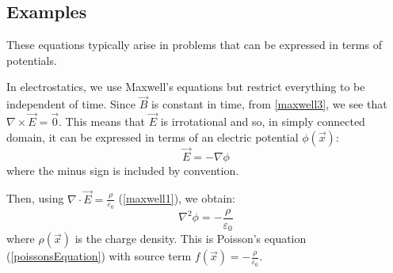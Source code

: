 \documentclass[../main.tex]{subfiles}
\begin{document}
\subsection{Examples}
These equations typically arise in problems that can be expressed in terms of potentials.
\begin{example}[Electrostatics]
  In electrostatics, we use Maxwell's equations but restrict everything to be independent of time.
  Since $\vec{B}$ is constant in time, from \cref{maxwell3}, we see that $\nabla \times \vec{E} = \vec{0}$.
  This means that $\vec{E}$ is irrotational and so, in simply connected domain, it can be expressed in terms of an electric potential $\phi(\vec{x})$:
  \[
    \vec{E} = - \nabla \phi
  \]
  where the minus sign is included by convention.

  Then, using $\nabla \cdot \vec{E} = \frac{\rho}{\varepsilon_0}$ (\cref{maxwell1}), we obtain:
  \begin{equation}
    \nabla^2 \phi = - \frac{\rho}{\varepsilon_0} \label{laplaceElectrostatic}
  \end{equation}
  where $\rho(\vec{x})$ is the charge density.
  This is Poisson's equation (\cref{poissonsEquation}) with source term $f(\vec{x}) = -\frac{\rho}{\varepsilon_0}$.
\end{example}
\end{document}
